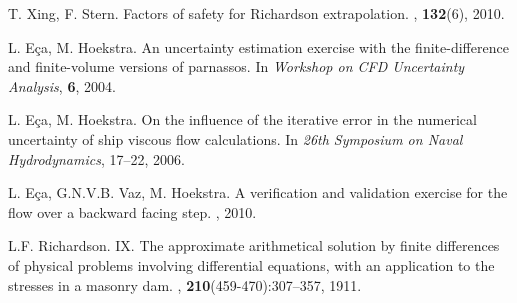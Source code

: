 \documentclass{cfdsc}
\begin{document}
\begin{multicols}{2}
\begin{thebibliography}{9}
T. Xing, F. Stern.
\newblock Factors of safety for {R}ichardson extrapolation.
, \textbf{132}(6), 2010.

L. E{\c{c}}a, M. Hoekstra.
\newblock An uncertainty estimation exercise with the finite-difference and finite-volume versions of parnassos.
\newblock In {\em Workshop on CFD Uncertainty Analysis}, \textbf{6}, 2004.


L. E{\c{c}}a, M. Hoekstra.
\newblock On the influence of the iterative error in the numerical uncertainty of ship viscous flow calculations.
\newblock In {\em 26th Symposium on Naval Hydrodynamics}, \textbf{}17--22, 2006.


L. E{\c{c}}a, G.N.V.B. Vaz, M. Hoekstra.
\newblock A verification and validation exercise for the flow over a backward facing step.
, \textbf{} 2010.


L.F. Richardson.
\newblock IX. The approximate arithmetical solution by finite differences of physical problems involving differential equations, with an application to the stresses in a masonry dam.
, \textbf{210}(459-470):307--357, 1911.




\end{thebibliography}


\end{multicols}
\end{document}
